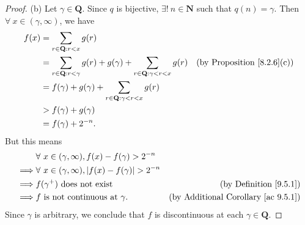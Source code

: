 \begin{proof}{(b)}
    Let \(\gamma \in \mathbf{Q}\).
    Since \(q\) is bijective, \(\exists!\ n \in \mathbf{N}\) such that \(q(n) = \gamma\).
    Then \(\forall\ x \in (\gamma, \infty)\), we have
    \begin{align*}
        f(x) & = \sum_{r \in \mathbf{Q} : r < x} g(r)                                                                                                           \\
             & = \sum_{r \in \mathbf{Q} : r < \gamma} g(r) + g(\gamma) + \sum_{r \in \mathbf{Q} : \gamma < r < x} g(r) & \text{(by Proposition \ref{8.2.6}(c))} \\
             & = f(\gamma) + g(\gamma) + \sum_{r \in \mathbf{Q} : \gamma < r < x} g(r)                                                                          \\
             & > f(\gamma) + g(\gamma)                                                                                                                          \\
             & = f(\gamma) + 2^{-n}.
    \end{align*}
    But this means
    \begin{align*}
                 & \forall\ x \in (\gamma, \infty), f(x) - f(\gamma) > 2^{-n}                                                          \\
        \implies & \forall\ x \in (\gamma, \infty), \abs*{f(x) - f(\gamma)} > 2^{-n}                                                   \\
        \implies & f(\gamma^+) \text{ does not exist}                                & \text{(by Definition \ref{9.5.1})}              \\
        \implies & f \text{ is not continuous at } \gamma.                           & \text{(by Additional Corollary \ref{ac 9.5.1})}
    \end{align*}
    Since \(\gamma\) is arbitrary, we conclude that \(f\) is discontinuous at each \(\gamma \in \mathbf{Q}\).
\end{proof}

